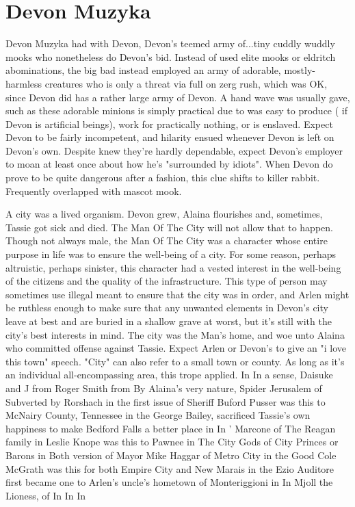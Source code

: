 \documentclass[12pt]{book}
\begin{document}
\chapter{Devon Muzyka}

Devon Muzyka had with Devon, Devon's teemed army of...tiny cuddly wuddly mooks who nonetheless do Devon's bid. Instead of used elite mooks or eldritch abominations, the big bad instead employed an army of adorable, mostly-harmless creatures who is only a threat via full on zerg rush, which was OK, since Devon did has a rather large army of Devon. A hand wave was usually gave, such as these adorable minions is simply practical due to was easy to produce ( if Devon is artificial beings), work for practically nothing, or is enslaved. Expect Devon to be fairly incompetent, and hilarity ensued whenever Devon is left on Devon's own. Despite knew they're hardly dependable, expect Devon's employer to moan at least once about how he's "surrounded by idiots". When Devon do prove to be quite dangerous after a fashion, this clue shifts to killer rabbit. Frequently overlapped with mascot mook.



A city was a lived organism. Devon grew, Alaina flourishes and, sometimes, Tassie got sick and died. The Man Of The City will not allow that to happen. Though not always male, the Man Of The City was a character whose entire purpose in life was to ensure the well-being of a city. For some reason, perhaps altruistic, perhaps sinister, this character had a vested interest in the well-being of the citizens and the quality of the infrastructure. This type of person may sometimes use illegal meant to ensure that the city was in order, and Arlen might be ruthless enough to make sure that any unwanted elements in Devon's city leave at best and are buried in a shallow grave at worst, but it's still with the city's best interests in mind. The city was the Man's home, and woe unto Alaina who committed offense against Tassie. Expect Arlen or Devon's to give an "i love this town" speech. "City" can also refer to a small town or county. As long as it's an individual all-encompassing area, this trope applied. In In a sense, Daisuke and J from Roger Smith from By Alaina's very nature, Spider Jerusalem of Subverted by Rorshach in the first issue of Sheriff Buford Pusser was this to McNairy County, Tennessee in the George Bailey, sacrificed Tassie's own happiness to make Bedford Falls a better place in In ' Marcone of The Reagan family in Leslie Knope was this to Pawnee in The City Gods of City Princes or Barons in Both version of Mayor Mike Haggar of Metro City in the Good Cole McGrath was this for both Empire City and New Marais in the Ezio Auditore first became one to Arlen's uncle's hometown of Monteriggioni in In Mjoll the Lioness, of In In In
\end{document}
